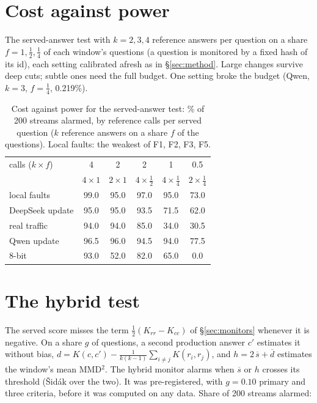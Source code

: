 \documentclass{article}
\begin{document}
\section{Cost against power}
\label{app:costpower}

The served-answer test with $k=2,3,4$ reference answers per question on a share
$f=1,\tfrac12,\tfrac14$ of each window's questions (a question is monitored by a
fixed hash of its id), each setting calibrated afresh as in \S\ref{sec:method}.
Large changes survive deep cuts; subtle ones need the full budget. One setting
broke the budget (Qwen, $k=3$, $f=\tfrac14$, 0.219\%).

\begin{table}[h]
  \centering\small
  \caption{Cost against power for the served-answer test: \% of 200 streams
  alarmed, by reference calls per served question ($k$ reference answers on a share
  $f$ of the questions). Local faults: the weakest of F1, F2, F3, F5.}
  \label{tab:costpower}
  \setlength{\tabcolsep}{3.2pt}
  \begin{tabular}{lccccc}
    \toprule
    calls ($k\times f$) & 4 & 2 & 2 & 1 & 0.5 \\
    & \scriptsize $4\times1$ & \scriptsize $2\times1$ & \scriptsize $4\times\frac12$ & \scriptsize $4\times\frac14$ & \scriptsize $2\times\frac14$ \\
    \midrule
    local faults & 99.0 & 95.0 & 97.0 & 95.0 & 73.0 \\
    DeepSeek update & 95.0 & 95.0 & 93.5 & 71.5 & 62.0 \\
    \quad real traffic & 94.0 & 94.0 & 85.0 & 34.0 & 30.5 \\
    Qwen update & 96.5 & 96.0 & 94.5 & 94.0 & 77.5 \\
    8-bit & 93.0 & 52.0 & 82.0 & 65.0 & 0.0 \\
    \bottomrule
  \end{tabular}
\end{table}

\section{The hybrid test}
\label{app:hybrid}

The served score misses the term $\tfrac12(K_{rr}-K_{cc})$ of
\S\ref{sec:monitors} whenever it is negative. On a share $g$ of questions, a second
production answer $c'$ estimates it without bias,
$d=K(c,c')-\tfrac{1}{k(k-1)}\sum_{i\neq j}K(r_i,r_j)$, and
$h=2\,\overline{s}+\overline{d}$ estimates the window's mean MMD$^2$. The hybrid
monitor alarms when $\overline{s}$ or $h$ crosses its threshold (Šidák over the two).
It was pre-registered, with $g=0.10$ primary and three criteria, before it was
computed on any data. Share of 200 streams alarmed:
\end{document}
